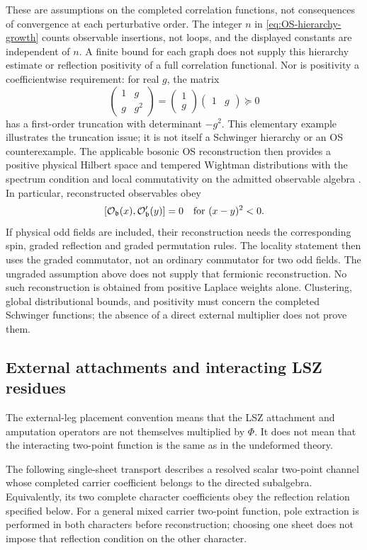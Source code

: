 \documentclass[final,5p,times,twocolumn,numbers,nopreprintline]{elsarticle}
\numberwithin{equation}{section}
\theoremstyle{definition}
\theoremstyle{remark}
\newcommand{\bb}{\mathfrak b}
\newcommand{\Ph}{\Phi}
\begin{document}
These are assumptions on the completed correlation functions,
not consequences of convergence at each perturbative order.
The integer \(n\) in \eqref{eq:OS-hierarchy-growth} counts
observable insertions, not loops, and the displayed constants are
independent of \(n\). A finite bound for each graph does not supply
this hierarchy estimate or reflection positivity of a full correlation
functional. Nor is positivity a coefficientwise requirement: for
real \(g\), the matrix
\[
 \begin{pmatrix}1&g\\g&g^2\end{pmatrix}
 =\begin{pmatrix}1\\g\end{pmatrix}\begin{pmatrix}1&g\end{pmatrix}
 \succeq0
\]
has a first-order truncation with determinant \(-g^2\).
This elementary example illustrates the truncation issue; it is not
itself a Schwinger hierarchy or an OS counterexample.
The applicable bosonic OS reconstruction then provides a positive
physical Hilbert space and tempered Wightman distributions with
the spectrum condition and local commutativity on the admitted
observable algebra \cite{OS1973,OS1975,StreaterWightman}.
In particular, reconstructed observables obey
\[
 [\mathcal O_{\bb}(x),\mathcal O'_{\bb}(y)]=0
 \quad\hbox{for }(x-y)^2<0.
\]
If physical odd fields are included, their reconstruction needs the
corresponding spin, graded reflection and graded permutation rules.
The locality statement then uses the graded commutator, not an
ordinary commutator for two odd fields. The ungraded assumption above
does not supply that fermionic reconstruction.
No such reconstruction is obtained from positive Laplace weights
alone. Clustering, global distributional bounds, and positivity
must concern the completed Schwinger functions; the absence of a
direct external multiplier does not prove them.
\subsection{External attachments and interacting LSZ residues}
\label{sec:LSZ}

The external-leg placement convention means that the LSZ attachment
and amputation operators are not themselves multiplied by \(\Ph\).
It does not mean that the interacting two-point function is the
same as in the undeformed theory.

The following single-sheet transport describes a resolved scalar
two-point channel whose completed carrier coefficient belongs to
the directed subalgebra. Equivalently, its two complete character
coefficients obey the reflection relation specified below. For a
general mixed carrier two-point function, pole extraction is performed
in both characters before reconstruction; choosing one sheet does
not impose that reflection condition on the other character.
\end{document}
